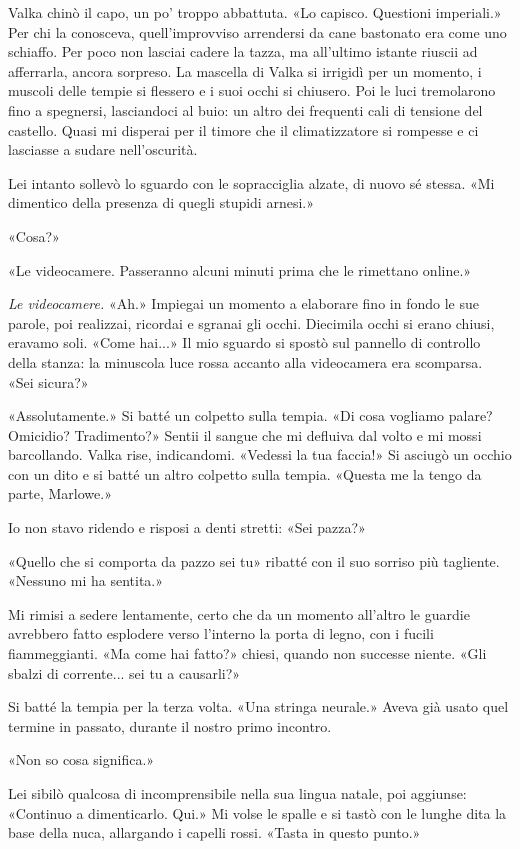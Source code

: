 Valka chinò il capo, un po' troppo abbattuta. «Lo capisco. Questioni
imperiali.» Per chi la conosceva, quell'improvviso arrendersi da cane
bastonato era come uno schiaffo. Per poco non lasciai {cadere} la tazza,
ma all'ultimo istante riuscii ad afferrarla, ancora sorpreso. La
mascella di Valka si irrigidì per un momento, i muscoli delle tempie si
flessero e i suoi occhi si chiusero. Poi le luci tremolarono fino a
spegnersi, lasciandoci al buio: un altro dei frequenti cali di tensione
del castello. Quasi mi disperai per il timore che il climatizzatore si
rompesse e ci lasciasse a sudare nell'oscurità.

Lei intanto sollevò lo sguardo con le sopracciglia alzate, di nuovo sé
stessa. «Mi dimentico della presenza di quegli stupidi arnesi.»

«Cosa?»

«Le videocamere. Passeranno alcuni minuti prima che le rimettano
online.»

\emph{Le videocamere.} «Ah.» Impiegai un momento a elaborare fino in
fondo le sue parole, poi realizzai, ricordai e sgranai gli occhi.
Diecimila occhi si erano chiusi, eravamo soli. «Come hai...» Il mio
sguardo si spostò sul pannello di controllo della stanza: la minuscola
luce rossa accanto alla videocamera era scomparsa. «Sei sicura?»

«Assolutamente.» Si batté un colpetto sulla tempia. «Di cosa vogliamo
palare? Omicidio? Tradimento?» Sentii il sangue che mi defluiva dal
volto e mi mossi barcollando. Valka rise, indicandomi. «Vedessi la tua
faccia!» Si asciugò un occhio con un dito e si batté un altro colpetto
sulla tempia. «Questa me la tengo da parte, Marlowe.»

Io non stavo ridendo e risposi a denti stretti: «Sei pazza?»

«Quello che si comporta da pazzo sei tu» ribatté con il suo sorriso più
tagliente. «Nessuno mi ha sentita.»

Mi rimisi a sedere lentamente, certo che da un momento all'altro le
guardie avrebbero fatto esplodere verso l'interno la porta di legno, con
i fucili fiammeggianti. «Ma come hai fatto?» chiesi, quando non successe
niente. «Gli sbalzi di corrente... sei tu a causarli?»

Si batté la tempia per la terza volta. «Una stringa neurale.» Aveva già
usato quel termine in passato, durante il nostro primo incontro.

«Non so cosa significa.»

Lei sibilò qualcosa di incomprensibile nella sua lingua natale, poi
aggiunse: «Continuo a dimenticarlo. Qui.» Mi volse le spalle e si tastò
con le lunghe dita la base della nuca, allargando i capelli rossi.
«Tasta in questo punto.»

